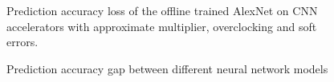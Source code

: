 \begin{figure}
    \caption{Prediction accuracy loss of the offline trained AlexNet on CNN accelerators with approximate multiplier, overclocking and soft errors.}
\label{fig:loss}
\vspace{-1em}
\end{figure}

\begin{figure}
    \caption{Prediction accuracy gap between different neural network models}
\label{fig:model-accuracy}
\vspace{-1em}
\end{figure}
